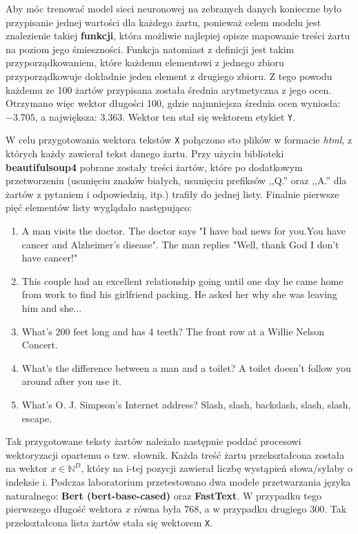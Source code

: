 \documentclass{article}
\newcommand{\code}[1]{\colorbox{light-gray}{\texttt{#1}}}
\begin{document}
\noindent Aby móc trenować model sieci neuronowej na zebranych danych konieczne było przypisanie jednej wartości dla każdego żartu, ponieważ celem modelu jest znalezienie takiej \textbf{funkcji}, która możliwie najlepiej opisze mapowanie treści żartu na poziom jego śmieszności. Funkcja natomiast z definicji jest takim przyporządkowaniem, które każdemu elementowi z jednego zbioru przyporządkowuje dokładnie jeden element z drugiego zbioru. Z tego powodu każdemu ze 100 żartów przypisana została średnia arytmetyczna z jego ocen. Otrzymano więc wektor długości 100, gdzie najmniejsza średnia ocen wyniosła: $-3.705$, a największa: $3.363$. Wektor ten stał się wektorem etykiet \code{Y}.

\vspace{0.2cm}

\noindent W celu przygotowania wektora tekstów \code{X} połączono sto plików w formacie \textit{html}, z których każdy zawierał tekst danego żartu. Przy użyciu biblioteki \textbf{beautifulsoup4} pobrane zostały treści żartów, które po dodatkowym przetworzeniu (usunięciu znaków białych, usunięciu prefiksów ,,Q.'' oraz ,,A.'' dla żartów z pytaniem i odpowiedzią, itp.) trafiły do jednej listy. Finalnie pierwsze pięć elementów listy wyglądało następująco:

    \begin{enumerate}
        \item A man visits the doctor. The doctor says "I have bad news for you.You have cancer and Alzheimer's disease". The man replies "Well, thank God I don't have cancer!"
        \item This couple had an excellent relationship going until one day he came home from work to find his girlfriend packing. He asked her why she was leaving him and she...
        \item What's 200 feet long and has 4 teeth?  The front row at a Willie Nelson Concert.
        \item What's the difference between a man and a toilet?  A toilet doesn't follow you around after you use it.
        \item What's O. J. Simpson's Internet address?  Slash, slash, backslash, slash, slash, escape.
    \end{enumerate}

\noindent Tak przygotowane teksty żartów należało następnie poddać procesowi wektoryzacji opartemu o tzw. słownik. Każda treść żartu przekształcona została na wektor $x \in \mathbb{N}^{D}$, który na i-tej pozycji zawierał liczbę wystąpień słowa/sylaby o indeksie i. Podczas laboratorium przetestowano dwa modele przetwarzania języka naturalnego: \textbf{Bert (bert-base-cased)} oraz \textbf{FastText}. W przypadku tego pierwszego długość wektora $x$ równa była 768, a w przypadku drugiego 300. Tak przekształcona lista żartów stała się wektorem \code{X}.
\end{document}
